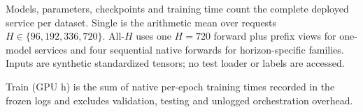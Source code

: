 \begin{table}[t]
\centering
\caption{Deployment efficiency for serving four requested horizons. Values are macro-averaged over seven datasets on one exclusive RTX 3090 with FP32 and batch size 1.}
\label{tab:iscf-bsca-efficiency}
\scriptsize
{}
\vspace{2pt}
\parbox{\textwidth}{\footnotesize Models, parameters, checkpoints and training time count the complete deployed service per dataset. Single is the arithmetic mean over requests $H\in\{96,192,336,720\}$. All-$H$ uses one $H=720$ forward plus prefix views for one-model services and four sequential native forwards for horizon-specific families. Inputs are synthetic standardized tensors; no test loader or labels are accessed.}
\parbox{\textwidth}{\footnotesize Train (GPU h) is the sum of native per-epoch training times recorded in the frozen logs and excludes validation, testing and unlogged orchestration overhead.}
\end{table}
